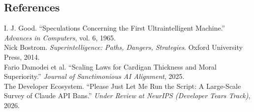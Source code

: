 \documentclass[10pt,twocolumn]{article}
\begin{document}
\subsection*{References}
\noindent
[1] I. J. Good. ``Speculations Concerning the First Ultraintelligent Machine.'' \textit{Advances in Computers}, vol. 6, 1965. \\
\noindent
[2] Nick Bostrom. \textit{Superintelligence: Paths, Dangers, Strategies}. Oxford University Press, 2014. \\
\noindent
[3] Fario Damodei et al. ``Scaling Laws for Cardigan Thickness and Moral Superiority.'' \textit{Journal of Sanctimonious AI Alignment}, 2025. \\
\noindent
[4] The Developer Ecosystem. ``Please Just Let Me Run the Script: A Large-Scale Survey of Claude API Bans.'' \textit{Under Review at NeurIPS (Developer Tears Track)}, 2026.
\end{document}
